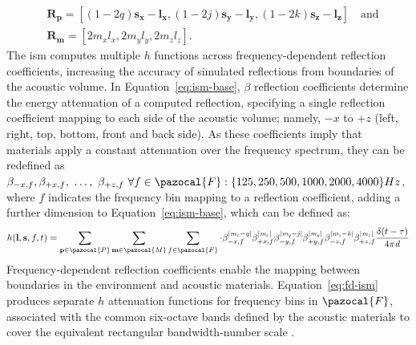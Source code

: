 \begin{align*}
    &\mathbf{R_p} = [ (1 - 2q)\mathbf{s_x} - \mathbf{l_x}, (1 - 2j)\mathbf{s_y} - \mathbf{l_y}, (1 - 2k)\mathbf{s_z} - \mathbf{l_z} ] 
    \quad \textrm{and} \\
    &\mathbf{R_m} = [2 m_x l_x, 2 m_y l_y, 2 m_z l_z]\textrm{.}
\end{align*}
The \acrshort{ism} computes multiple $h$ functions across frequency-dependent reflection coefficients, increasing the accuracy of simulated reflections from boundaries of the acoustic volume. In Equation~\ref{eq:ism-base}, $\beta$ reflection coefficients determine the energy attenuation of a computed reflection, specifying a single reflection coefficient mapping to each side of the acoustic volume; namely, $-x$ to $+z$  (left, right, top, bottom, front and back side). As these coefficients imply that materials apply a constant attenuation over the frequency spectrum, they can be redefined as $\beta_{-x,f}, \beta_{+x,f},~\dots, ~\beta_{+z,f}~\forall f \in \pazocal{F}: \{125, 250, 500, 1000, 2000, 4000\} Hz$, where $f$ indicates the frequency bin mapping to a reflection coefficient, adding a further dimension to Equation~\ref{eq:ism-base}, which can be defined as:
\begin{equation}\label{eq:fd-ism}    
 h(\mathbf{l}, \mathbf{s}, f, t) = \sum_{\mathbf{p} \in \pazocal{P}} \sum_{\mathbf{m} \in \pazocal{M}} \sum_{f \in \pazocal{F}}\cdot
\beta_{ {-x,f } }^{|\mathit{m_x - q}|} \beta_{+x, f }^{|\mathit{m_x}|} \beta_{ -y,f}^{|\mathit{m_y - j}|} \beta_{ +y, f }^{|\mathit{m_y}|} \beta_{ -z, f }^{|\mathit{m_z - k}|} \beta_{ +z, f }^{|\mathit{m_z}|} \frac{\delta(t - \tau)}{4\pi \mathit{d}}
\end{equation}
Frequency-dependent reflection coefficients enable the mapping between boundaries in the environment and acoustic materials. Equation~\ref{eq:fd-ism} produces separate $h$ attenuation functions for frequency bins in $\pazocal{F}$, associated with the common six-octave bands defined by the acoustic materials to cover the equivalent rectangular bandwidth-number scale \citep{kuttruff2016room, savioja2015overview}.

